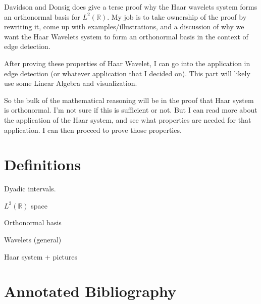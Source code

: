 \documentclass[11pt]{amsart}
\theoremstyle{theorem} %
\theoremstyle{definition}                  %
\theoremstyle{example}                       %
\theoremstyle{remark}                       %
\numberwithin{equation}{section}
\newcommand{\R}{\mathbb{R}}
\begin{document}
Davidson and Donsig does give a terse proof why the Haar wavelets system forms an orthonormal basis for $ L^2(\R) $. My job is to take ownership of the proof by rewriting it, come up with examples/illustrations, and a discussion of why we want the Haar Wavelets system to form an orthonormal basis in the context of edge detection.

After proving these properties of Haar Wavelet, I can go into the application in edge detection (or whatever application that I decided on). This part will likely use some Linear Algebra and visualization.

So the bulk of the mathematical reasoning will be in the proof that Haar system is orthonormal. I'm not sure if this is sufficient or not. But I can read more about the application of the Haar system, and see what properties are needed for that application. I can then proceed to prove those properties.

\section{Definitions}
Dyadic intervals.

$ L^2(\R) $ space

Orthonormal basis

Wavelets (general)

Haar system + pictures
 
\section{Annotated Bibliography}
\end{document}
